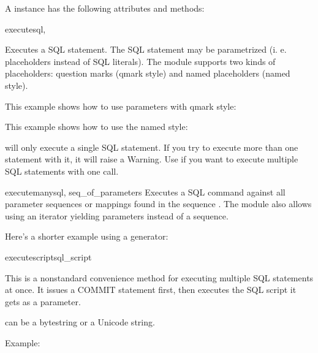 A  instance has the following attributes and methods:

\begin{methoddesc}{execute}{sql, }

Executes a SQL statement. The SQL statement may be parametrized (i. e.
placeholders instead of SQL literals). The  module supports two kinds of
placeholders: question marks (qmark style) and named placeholders (named
style).

This example shows how to use parameters with qmark style:

    

This example shows how to use the named style:

    

     will only execute a single SQL statement. If you try to
    execute more than one statement with it, it will raise a Warning. Use
     if you want to execute multiple SQL statements with one
    call.
\end{methoddesc}


\begin{methoddesc}{executemany}{sql, seq_of_parameters}
Executes a SQL command against all parameter sequences or mappings found in the
sequence . The  module also allows
using an iterator yielding parameters instead of a sequence.



Here's a shorter example using a generator:


\end{methoddesc}

\begin{methoddesc}{executescript}{sql_script}

This is a nonstandard convenience method for executing multiple SQL statements
at once. It issues a COMMIT statement first, then executes the SQL script it
gets as a parameter.

 can be a bytestring or a Unicode string.

Example:


\end{methoddesc}

